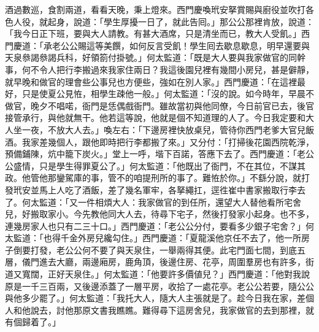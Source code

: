 酒過數巡，食割兩道，看看天晚，秉上燈來。西門慶喚玳安拏賞賜與廚役並吹打各色人役，就起身，說道：「學生厚擾一日了，就此告囘。」那公公那裡肯放，說道：「我今日正下班，要與大人請教。有甚大酒席，只是清坐而已，教大人受飢。」西門慶道：「承老公公賜這等美饌，如何反言受飢！學生囘去歇息歇息，明早還要與天泉叅謁叅謁兵科，好領箚付掛號。」何太監道：「既是大人要與我家做官的同幹事，何不令人把行李搬過來我家住兩日？我這後園兒裡有幾間小房兒，甚是僻靜，就早晚和做官的理會些公事兒也方便些，強如在別人家。」西門慶道：「在這裡最好，只是使夏公見恠，相學生疎他一般。」何太監道：「沒的說。如今時年，早晨不做官，晚夕不唱喏，衙門是恁偶戲衙門。{}雖故當初與他同僚，今日前官已去，後官接管承行，與他就無干。他若這等說，他就是個不知道理的人了。{}今日我定要和大人坐一夜，不放大人去。」喚左右：「下邊房裡快放桌兒，管待你西門老爹大官兒飯酒。我家差幾個人，跟他即時把行李都搬了來。」又分付：「打掃後花園西院乾淨，預備鋪陳，炕中籠下炭火。」堂上一呼，堦下百諾，答應下去了。西門慶道：「老公公盛情，只是學生得罪夏公了。」何太監道：「他既出了衙門，不在其位，不謀其政。他管他那鑾駕庫的事，{}管不的咱提刑所的事了。難恠於你。」不繇分說，就打發玳安並馬上人吃了酒飯，差了幾名軍牢，各拏繩扛，逕徃崔中書家搬取行李去了。何太監道：「又一件相煩大人：我家做官的到任所，還望大人替他看所宅舍兒，好搬取家小。今先教他同大人去，待尋下宅子，然後打發家小起身。也不多，連幾房家人也只有二三十口。」西門慶道：「老公公分付，要看多少銀子宅舍？」何太監道：「也得千金外房兒纔勾住。」西門慶道：「夏龍溪他京任不去了，他一所房子倒要打發，老公公何不要了與天泉住，一舉兩得其便。此宅門面七間，到底五層，儀門進去大廳，兩邊廂房，鹿角頂，後邊住房、花亭，周圍羣房也有許多，街道又寬闊，正好天泉住。」何太監道：「他要許多價値兒？」西門慶道：「他對我說原是一千三百兩，又後邊添蓋了一層平房，收拾了一處花亭。老公公若要，隨公公與他多少罷了。」何太監道：「我托大人，隨大人主張就是了。趁今日我在家，差個人和他說去，討他那原文書我瞧瞧。難得尋下這房舍兒，我家做官的去到那裡，就有個歸着了。」

